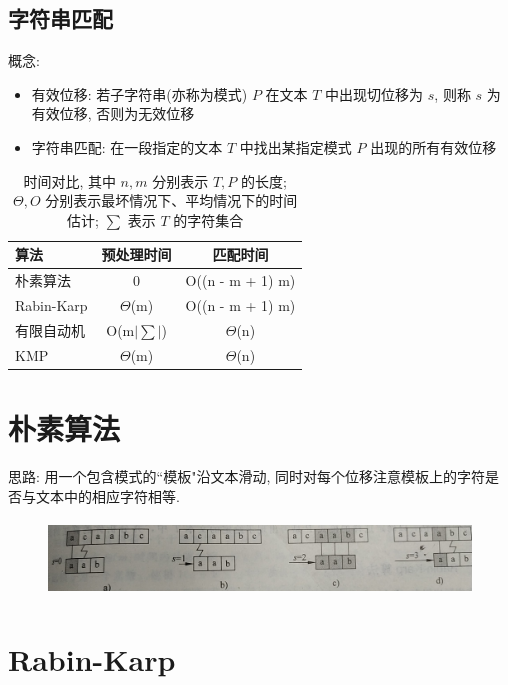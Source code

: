 \subsection{字符串匹配}
概念:
\begin{itemize}
\item 有效位移: 若子字符串(亦称为模式) $P$ 在文本 $T$ 中出现切位移为 $s$, 则称 $s$ 为有效位移, 否则为无效位移
\item 字符串匹配: 在一段指定的文本 $T$ 中找出某指定模式 $P$ 出现的所有有效位移
\end{itemize}

\begin{table}[h]
    \centering
    \begin{tabular}{lcc}
        \hline
        算法 & 预处理时间 & 匹配时间 \\
        \hline
        朴素算法 & 0 & O{((n - m + 1) m)} \\
        Rabin-Karp & $\Theta$(m) & O((n - m + 1) m) \\
        有限自动机 & O(m$|\sum|$) & $\Theta$(n) \\
        KMP & $\Theta$(m) & $\Theta$(n) \\
        \hline
    \end{tabular}
\caption{时间对比, 其中 $n,m$ 分别表示 $T,P$ 的长度; $\Theta,O$ 分别表示最坏情况下、平均情况下的时间估计; $\sum$ 表示 $T$ 的字符集合}
\end{table}

\section*{朴素算法}

思路: 用一个包含模式的``模板"沿文本滑动, 同时对每个位移注意模板上的字符是否与文本中的相应字符相等. 

\begin{figure}[h]
    \centering
    \includegraphics[height=2cm,width=14cm]{notes/algorithm/pic/朴素字符串匹配.png}
\end{figure}

\section*{Rabin-Karp}

